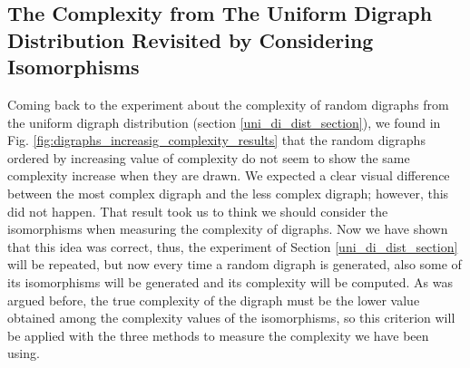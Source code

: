 \subsection{The Complexity from The Uniform Digraph Distribution Revisited by Considering Isomorphisms}
\label{uni_di_dist_section_with_iso}
Coming back to the experiment about the complexity of random digraphs from the uniform digraph distribution (section \ref{uni_di_dist_section}), we found in Fig. \ref{fig:digraphs_increasig_complexity_results} that the random digraphs ordered by increasing value of complexity do not seem to show the same complexity increase when they are drawn. We expected a clear visual difference between the most complex digraph and the less complex digraph; however, this did not happen. That result took us to think we should consider the isomorphisms when measuring the complexity of digraphs. Now we have shown that this idea was correct, thus, the experiment of Section \ref{uni_di_dist_section} will be repeated, but now every time a random digraph is generated, also some of its isomorphisms will be generated and its complexity will be computed. As was argued before, the true complexity of the digraph must be the lower value obtained among the complexity values of the isomorphisms, so this criterion will be applied with the three methods to measure the complexity we have been using.\\

